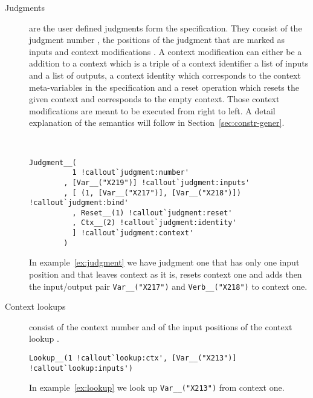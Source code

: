 \begin{description}
\item[Judgments] are the user defined judgments form the
  specification. They consist of the judgment number
  , the positions of the judgment that are
  marked as inputs  and context
  modifications . A context modification
  can either be a addition to a context 
  which is a triple of a context identifier a list of inputs and a
  list of outputs, a context identity 
  which corresponds to the context meta-variables in the specification
  and a reset operation  which resets the given context and corresponds
  to the empty context. Those context modifications are meant to be
  executed from right to left. A detail explanation of the semantics
  will follow in Section~\ref{sec:constr-gener}.

\begin{example}{~}
\begin{verbatim}
Judgment__(
          1 !callout`judgment:number'
        , [Var__("X219")] !callout`judgment:inputs'
        , [ (1, [Var__("X217")], [Var__("X218")]) !callout`judgment:bind'
          , Reset__(1) !callout`judgment:reset'
          , Ctx__(2) !callout`judgment:identity'
          ] !callout`judgment:context'
        )
\end{verbatim}
\label{ex:judgment}
\end{example}

  In example~\ref{ex:judgment} we have judgment one that has only one input
  position and that leaves context as it is, resets context one and
  adds then the input/output pair \verb|Var__("X217")| and
  \verb|Verb__("X218")| to context one.

\item[Context lookups] consist of the context number
   and of the input positions of the context
  lookup .

\begin{example}
\begin{verbatim}
Lookup__(1 !callout`lookup:ctx', [Var__("X213")] !callout`lookup:inputs')
\end{verbatim}
\label{ex:lookup}
\end{example}

  In example~\ref{ex:lookup} we look up \verb|Var__("X213")| from
  context one.


\end{description}
